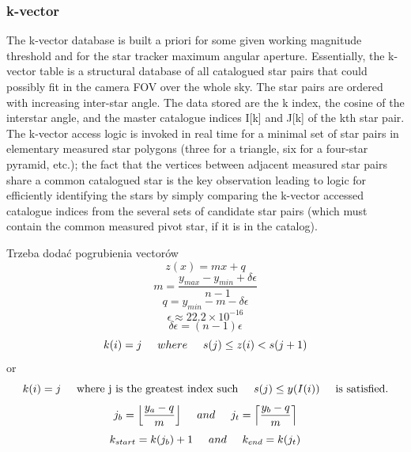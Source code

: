 \documentclass[12pt,a4paper,oneside]{article}
\begin{document}
\subsubsection{k-vector}
The k-vector database is built a priori for some given working
magnitude threshold and for the star tracker maximum angular aperture. Essentially, the k-vector table is a structural database of all catalogued star pairs that could possibly fit in the camera FOV over the whole sky. The star pairs are ordered with increasing inter-star angle.
The data stored are the k index, the cosine of the interstar angle, and the master catalogue indices I[k] and J[k] of the kth star pair. The k-vector access logic is invoked in real time for a minimal set of star pairs in elementary measured star polygons (three for a triangle, six for a four-star pyramid, etc.); the fact that the vertices between adjacent measured star pairs share a common catalogued star is the key observation leading to logic for efficiently identifying the stars by simply comparing the k-vector accessed catalogue indices from the several sets of candidate star pairs (which must contain the common measured pivot star, if
it is in the catalog).
\citet{mortari2013k}\par
\citet{mortari1996fast}\par
\citet{mortari2000k}\par
Trzeba dodać pogrubienia vectorów
\begin{equation}
z(x) = mx + q
\end{equation}
\begin{equation}
m = \frac{y_{max} - y_{min} + \delta\epsilon}{n - 1}
\end{equation}
\begin{equation}
q = y_{min} - m - \delta\epsilon
\end{equation}
\begin{equation}
\epsilon \approx 22.2 \times 10^{-16}
\end{equation}
\begin{equation}
\delta\epsilon = (n - 1)\epsilon
\end{equation}
\begin{equation}
k(i) = j \hspace{0.5cm} where \hspace{0.5cm} s(j) \leq z(i) < s(j + 1)
\end{equation}
or
\begin{equation}
k(i) = j \hspace{0.5cm} \textnormal{where j is the greatest index such} \hspace{0.5cm} s(j) \leq y(I(i)) \hspace{0.5cm} \textnormal{is satisfied.}
\end{equation}
\begin{equation}
j_b = \Big\lfloor\frac{y_a - q}{m}\Big\rfloor \hspace{0.5cm} and \hspace{0.5cm} j_t = \Big\lceil\frac{y_b - q}{m}\Big\rceil
\end{equation}
\begin{equation}
k_{start} = k(j_b) + 1 \hspace{0.5cm} and \hspace{0.5cm} k_{end} = k(j_t)
\end{equation}
\end{document}
